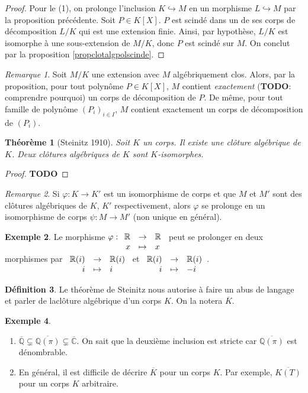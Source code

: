 \documentclass{article}
\newcommand{\Q}{\mathbb{Q}}
\newcommand{\Qbar}{\overline{\mathbb{Q}}}
\newcommand{\R}{\mathbb{R}}
\newcommand{\C}{\mathbb{C}}
\newcommand{\todo}{\textbf{TODO}}
\newcommand{\applic}[4]{\begin{array}[t]{rcl}
#1 & \to & #2 \\
#3 & \mapsto & #4
\end{array}}
\theoremstyle{plain}
\newtheorem{theorem}{Théorème}[section]
\theoremstyle{definition}
\newtheorem{definition}[theorem]{Définition}
\newtheorem{example}[theorem]{Exemple}
\theoremstyle{remark}
\newtheorem*{remark}{Remarque}
\begin{document}
\begin{proof}
    Pour le (1), on prolonge l'inclusion $K \hookrightarrow M$ en un morphisme $L \hookrightarrow M$ par la proposition précédente. Soit $P \in K[X]$. $P$ est scindé dans un de ses corps de décomposition $L/K$ qui est une extension finie. Ainsi, par hypothèse, $L/K$ est isomorphe à une sous-extension de $M/K$, donc $P$ est scindé sur $M$. On conclut par la proposition \ref{propclotalgpolscinde}.
\end{proof}

\begin{remark}
    Soit $M/K$ une extension avec $M$ algébriquement clos. Alors, par la proposition, pour tout polynôme $P \in K[X]$, $M$ contient \emph{exactement} (\todo : comprendre pourquoi) un corps de décomposition de $P$. De même, pour tout famille de polynôme $(P_i)_{i\in I}$, $M$ contient exactement un corps de décomposition de $(P_i)$.
\end{remark}

\begin{theorem}[Steinitz 1910]
    Soit $K$ un corps. Il existe une clôture algébrique de $K$. Deux clôtures algébriques de $K$ sont $K$-isomorphes.
\end{theorem}

\begin{proof}
    \todo
\end{proof}

\begin{remark}
    Si $\varphi : K \to K'$ est un isomorphisme de corps et que $M$ et $M'$ sont des clôtures algébriques de $K$, $K'$ respectivement, alors $\varphi$ se prolonge en un isomorphisme de corps $\psi : M \to M'$ (non unique en général).
\end{remark}

\begin{example}
    Le morphisme $\varphi : \applic{\R}{\R}{x}{x}$ peut se prolonger en deux morphismes par $\applic{\R(i)}{\R(i)}{i}{i}$ et $\applic{\R(i)}{\R(i)}{i}{-i}$.
\end{example}

\begin{definition}
    Le théorème de Steinitz nous autorise à faire un abus de langage et parler de \og la\fg clôture algébrique d'un corps $K$. On la notera $\overline{K}$.
\end{definition}

\begin{example} \leavevmode
    \begin{enumerate}
        \item $\Qbar \subsetneq \overline{\Q(\pi)} \subsetneq \overline{\C}$. On sait que la deuxième inclusion est stricte car $\overline{\Q(\pi)}$ est dénombrable.
        \item En général, il est difficile de décrire $\overline{K}$ pour un corps $K$. Par exemple, $\overline{K(T)}$ pour un corps $K$ arbitraire.
    \end{enumerate}
\end{example}
\end{document}
